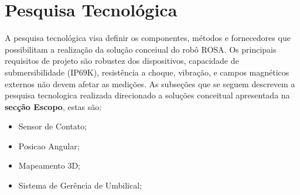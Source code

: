 

\setcounter{secnumdepth}{3}
\chapter{Pesquisa Tecnológica}
\label{pesqtec}


A pesquisa tecnológica visa definir os componentes, métodos e fornecedores que possibilitam a realização da solução conceiual do robô ROSA. Os principais requisitos de projeto são robustez dos dispositivos, capacidade de submersibilidade (IP69K), resistência a choque, vibração, e campos magnéticos
externos não devem afetar as medições. As subseções que se seguem descrevem a pesquisa tecnologica realizada direcionado a soluções conceitual apresentada na {\bf secção Escopo}, estas são: 

\begin{itemize}

	\item Sensor de Contato; 
	\item Posicao Angular; 
	\item Mapeamento 3D; 
	\item Sistema de Gerência de Umbilical;

\end{itemize}


